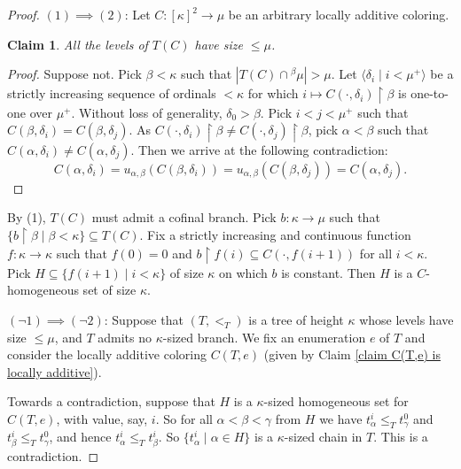 \documentclass[11pt]{amsart}
\theoremstyle{plain}
\newtheorem{claim}[theorem]{Claim}
\theoremstyle{definition} %
\theoremstyle{remark}
\begin{document}
\begin{proof} $(1)\implies(2)$: Let $C:[\kappa]^2\rightarrow\mu$ be an arbitrary locally additive coloring.
\begin{claim} All the levels of $  T(C)$ have size $\le\mu$.
\end{claim}
\begin{proof} Suppose not. Pick $\beta<\kappa$ such that $|  T(C)\cap{}^\beta\mu|>\mu$.
Let $\langle \delta_i\mid i<\mu^+\rangle$
be a strictly increasing sequence of ordinals $<\kappa$ for which $i\mapsto C(\cdot,\delta_i)\restriction\beta$ is one-to-one over $\mu^+$.
Without loss of generality, $\delta_0>\beta$. Pick $i<j<\mu^+$ such that $C(\beta,\delta_i)=C(\beta,\delta_j)$.
As $C(\cdot,\delta_i)\restriction\beta\neq C(\cdot,\delta_j)\restriction\beta$, pick $\alpha<\beta$ such that $C(\alpha,\delta_i)\neq C(\alpha,\delta_j)$.
Then we arrive at the following contradiction:
$$C(\alpha,\delta_i)=u_{\alpha,\beta}(C(\beta,\delta_i))=u_{\alpha,\beta}(C(\beta,\delta_j))=C(\alpha,\delta_j).$$
\end{proof}
By (1), $  T(C)$ must admit a cofinal branch. Pick $b:\kappa\rightarrow\mu$ such that $\{ b\restriction\beta\mid \beta<\kappa\}\subseteq   T(C)$.
Fix a strictly increasing and continuous function $f:\kappa\rightarrow\kappa$ such that $f(0)=0$ and $b\restriction f(i)\subseteq C(\cdot,f(i+1))$ for all $i<\kappa$.
Pick $H\subseteq \{ f(i+1)\mid i<\kappa\}$ of size $\kappa$ on which $b$ is constant. Then $H$ is a $C$-homogeneous set of size $\kappa$.

$(\neg1)\implies(\neg2)$: Suppose that $ (T,<_T)$ is a tree of height $\kappa$ whose levels have size $\le\mu$, and $  T$ admits no $\kappa$-sized branch. We fix an enumeration $e$ of $T$ and consider the locally additive coloring $C(T,e)$ (given by Claim \ref{claim C(T,e) is locally additive}).

Towards a contradiction, suppose that $H$ is a $\kappa$-sized homogeneous set for $C(T,e)$, with value, say, $i$.
So for all $\alpha<\beta<\gamma$ from $H$ we have $t^i_\alpha\leq_T t_\gamma^0$ and $t^i_\beta\leq_T t_\gamma^0$,
and hence $t^i_\alpha\leq_T t^i_\beta$. So $\{ t^i_\alpha\mid \alpha\in H\}$ is a $\kappa$-sized chain in $  T$.
This is a contradiction.
\end{proof}










\end{document}
